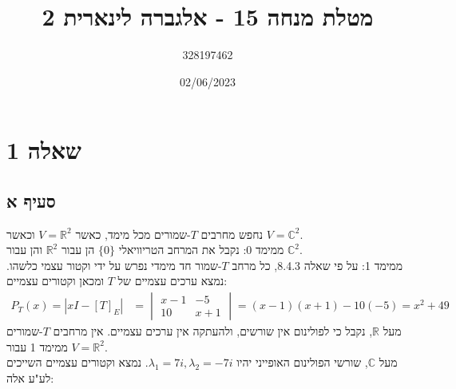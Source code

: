 \documentclass{article}
\title{מטלת מנחה 15 - אלגברה לינארית 2}
\author{328197462}
\date{02/06/2023}
\def\reals{\mathbb{R}}
\def\complex{\mathbb{C}}
\begin{document}
\maketitle

\section*{שאלה 1}

\subsection*{סעיף א}

נחפש מחרבים $T$-שמורים מכל מימד, כאשר $V=\reals^2$ וכאשר $V=\complex^2$. \\
ממימד 0: נקבל את המרחב הטריוויאלי $\{ 0 \}$ הן עבור $\reals^2$ והן עבור $\complex^2$. \\
ממימד 1: על פי שאלה 8.4.3, כל מרחב $T$-שמור חד מימדי נפרש על ידי וקטור עצמי כלשהו. נמצא ערכים עצמיים של $T$ ומכאן וקטורים עצמיים: \\
\begin{align*}
    P_T(x)=|xI-[T]_E| & =\begin{vmatrix}
                             x-1 & -5  \\
                             10  & x+1
                         \end{vmatrix} = (x-1)(x+1)-10(-5)=x^2+49
\end{align*}
מעל $\reals$, נקבל כי לפולינום אין שורשים, ולהעתקה אין ערכים עצמיים. אין מרחבים $T$-שמורים ממימד 1 עבור $V=\reals^2$. \\
מעל $\complex$, שורשי הפולינום האופייני יהיו $\lambda_1=7i, \lambda_2=-7i$. נמצא וקטורים עצמיים השייכים לע"ע אלה:
\end{document}
